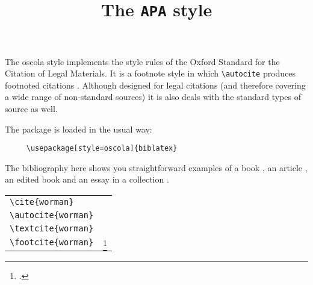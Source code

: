 \documentclass[varwidth=\textwidth,class=article,border=5pt]{standalone}
\begin{document}
\title{The \texttt{APA} style}
\author{}\date{}
\maketitle


The \textsf{oscola} style implements the style rules of the Oxford Standard for the Citation of Legal Materials. It is a footnote style in which  \verb~\autocite~ produces footnoted citations \autocite{worman, reese}. Although designed for legal citations (and therefore covering a wide range of non-standard sources) it is also deals with the standard types of source as well.

\quad The package is loaded in the usual way:
\begin{verbatim}
     \usepackage[style=oscola]{biblatex}
\end{verbatim}

\quad The bibliography here shows you straightforward examples of a book \autocite{worman}, an article \autocite{reese}, an edited book \autocite{aristotle:anima} and an essay in a collection \autocite{gaonkar:in}.

\medskip

\begin{tabular}{ll}
\verb|\cite{worman}| & \cite{worman} \\
\verb|\autocite{worman}| & \autocite{worman} \\
\verb|\textcite{worman}| & \textcite{worman} \\
\verb|\footcite{worman}| & \strut\footcite{worman}
\end{tabular}


\printbibliography
\end{document}
